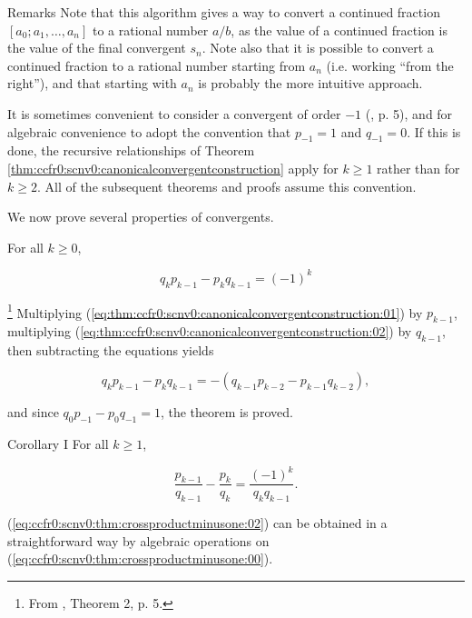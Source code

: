 \begin{vworktheoremparsection}{Remarks}
Note that this algorithm gives a way to convert a continued fraction
$[a_0;a_1,\ldots{},a_n]$ to a rational number $a/b$, as the value of
a continued fraction is the value of the final convergent $s_n$.
Note also that it is possible to convert a continued fraction to
a rational number starting from $a_n$ (i.e. working ``from
the right''), and that starting with $a_n$ is probably the 
more intuitive approach.
\end{vworktheoremparsection}
\vworktheoremfooter{}

It is sometimes convenient to consider a convergent of order
$-1$ (\cite{bibref:b:KhinchinClassic}, p. 5), and for 
algebraic convenience to adopt the convention that 
$p_{-1} = 1$ and $q_{-1} = 0$.  If this is done, the recursive
relationships of Theorem \ref{thm:ccfr0:scnv0:canonicalconvergentconstruction}
apply for $k \geq 1$ rather than for $k \geq 2$.  All of the subsequent
theorems and proofs assume this convention.

We now prove several properties of convergents.

\begin{vworktheoremstatement}
\label{thm:ccfr0:scnv0:crossproductminusone}
For all $k \geq 0$,

\begin{equation}
\label{eq:ccfr0:scnv0:thm:crossproductminusone:00}
q_k p_{k-1} - p_k q_{k-1} = (-1)^k
\end{equation}
\end{vworktheoremstatement}
\begin{vworktheoremproof}\hspace{-0.4em}\footnote{From
\cite{bibref:b:KhinchinClassic}, Theorem 2, p. 5.}
Multiplying (\ref{eq:thm:ccfr0:scnv0:canonicalconvergentconstruction:01})
by $p_{k-1}$, multiplying 
(\ref{eq:thm:ccfr0:scnv0:canonicalconvergentconstruction:02}) by
$q_{k-1}$, then subtracting the equations yields

\begin{equation}
\label{eq:ccfr0:scnv0:thm:crossproductminusone:01}
q_k p_{k-1} - p_k q_{k-1} = -(q_{k-1} p_{k-2} - p_{k-1} q_{k-2}) ,
\end{equation}

and since $q_0 p_{-1} - p_0 q_{-1} = 1$, the theorem is 
proved.
\end{vworktheoremproof}
\begin{vworktheoremparsection}{Corollary I}
For all $k \geq 1$,

\begin{equation}
\label{eq:ccfr0:scnv0:thm:crossproductminusone:02}
\frac{p_{k-1}}{q_{k-1}} - \frac{p_k}{q_k} = \frac{(-1)^k}{q_k q_{k-1}} .
\end{equation}
\end{vworktheoremparsection}
\begin{vworktheoremproof}
(\ref{eq:ccfr0:scnv0:thm:crossproductminusone:02}) can be obtained
in a straightforward way by algebraic operations on
(\ref{eq:ccfr0:scnv0:thm:crossproductminusone:00}).
\end{vworktheoremproof}

